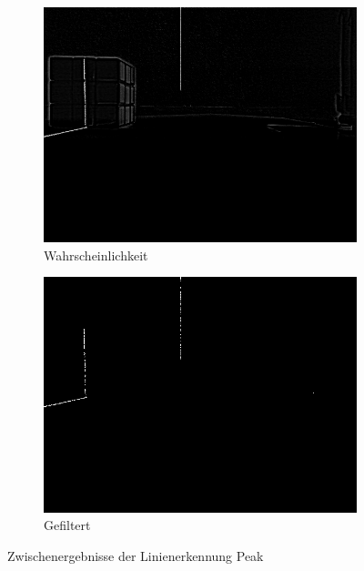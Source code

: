 \documentclass[ngerman,a4paper,parskip=half]{scrartcl}
\begin{document}
\begin{figure}
	\begin{subfigure}{0.45\textwidth}
		\includegraphics[width=\textwidth]{includes/line_peak_eval.png}
		\caption{Wahrscheinlichkeit}
	\end{subfigure}
	\hfill
	\begin{subfigure}{0.45\textwidth}
		\includegraphics[width=\textwidth]{includes/line_peak_filtered.png}
		\caption{Gefiltert}
	\end{subfigure}

	\caption{Zwischenergebnisse der Linienerkennung Peak}
	\label{fig:peak}
\end{figure}
\end{document}
